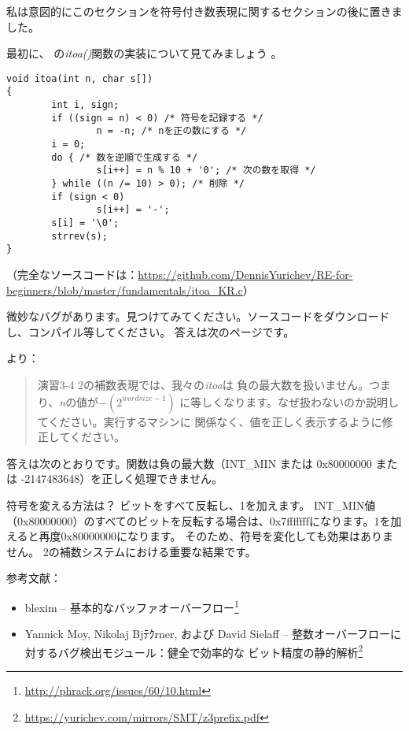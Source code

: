 ﻿

私は意図的にこのセクションを符号付き数表現に関するセクションの後に置きました。

最初に、 \InSqBrackets{\KRBook}の\emph{itoa()}関数の実装について見てみましょう 。

\begin{lstlisting}[style=customc]
void itoa(int n, char s[])
{
        int i, sign;
        if ((sign = n) < 0) /* 符号を記録する */
                n = -n; /* nを正の数にする */
        i = 0;
        do { /* 数を逆順で生成する */
                s[i++] = n % 10 + '0'; /* 次の数を取得 */
        } while ((n /= 10) > 0); /* 削除 */
        if (sign < 0)
                s[i++] = '-';
        s[i] = '\0';
        strrev(s);
}
\end{lstlisting}

（完全なソースコードは：\url{https://github.com/DennisYurichev/RE-for-beginners/blob/master/fundamentals/itoa_KR.c}）

微妙なバグがあります。見つけてみてください。ソースコードをダウンロードし、コンパイル等してください。
答えは次のページです。

\clearpage

\InSqBrackets{\KRBook}より：

\begin{framed}
\begin{quotation}
演習3-4 2の補数表現では、我々の\emph{itoa}は
負の最大数を扱いません。つまり、\emph{n}の値が$-(2^{wordsize-1})$
に等しくなります。なぜ扱わないのか説明してください。実行するマシンに
関係なく、値を正しく表示するように修正してください。
\end{quotation}
\end{framed}

答えは次のとおりです。関数は負の最大数（INT\_MIN または 0x80000000 または -2147483648）を正しく処理できません。

符号を変える方法は？ ビットをすべて反転し、1を加えます。
INT\_MIN値（0x80000000）のすべてのビットを反転する場合は、0x7fffffffになります。1を加えると再度0x80000000になります。
そのため、符号を変化しても効果はありません。
2の補数システムにおける重要な結果です。

参考文献：

\begin{itemize}
\item blexim -- 基本的なバッファオーバーフロー\footnote{\url{http://phrack.org/issues/60/10.html}}

\item Yannick Moy, Nikolaj Bjﾃｸrner, および David Sielaff -- 整数オーバーフローに対するバグ検出モジュール：健全で効率的な
ビット精度の静的解析\footnote{\url{https://yurichev.com/mirrors/SMT/z3prefix.pdf}}
\end{itemize}

